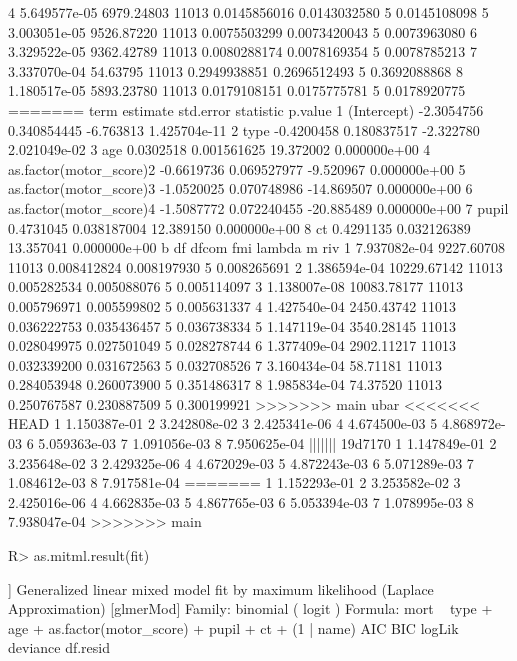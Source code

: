 \documentclass[
]{jss}
\begin{document}
\begin{CodeChunk}
\begin{CodeOutput}
4 5.649577e-05  6979.24803 11013 0.0145856016 0.0143032580 5 0.0145108098
5 3.003051e-05  9526.87220 11013 0.0075503299 0.0073420043 5 0.0073963080
6 3.329522e-05  9362.42789 11013 0.0080288174 0.0078169354 5 0.0078785213
7 3.337070e-04    54.63795 11013 0.2949938851 0.2696512493 5 0.3692088868
8 1.180517e-05  5893.23780 11013 0.0179108151 0.0175775781 5 0.0178920775
=======
                     term   estimate   std.error  statistic      p.value
1             (Intercept) -2.3054756 0.340854445  -6.763813 1.425704e-11
2                    type -0.4200458 0.180837517  -2.322780 2.021049e-02
3                     age  0.0302518 0.001561625  19.372002 0.000000e+00
4 as.factor(motor_score)2 -0.6619736 0.069527977  -9.520967 0.000000e+00
5 as.factor(motor_score)3 -1.0520025 0.070748986 -14.869507 0.000000e+00
6 as.factor(motor_score)4 -1.5087772 0.072240455 -20.885489 0.000000e+00
7                   pupil  0.4731045 0.038187004  12.389150 0.000000e+00
8                      ct  0.4291135 0.032126389  13.357041 0.000000e+00
             b          df dfcom         fmi      lambda m         riv
1 7.937082e-04  9227.60708 11013 0.008412824 0.008197930 5 0.008265691
2 1.386594e-04 10229.67142 11013 0.005282534 0.005088076 5 0.005114097
3 1.138007e-08 10083.78177 11013 0.005796971 0.005599802 5 0.005631337
4 1.427540e-04  2450.43742 11013 0.036222753 0.035436457 5 0.036738334
5 1.147119e-04  3540.28145 11013 0.028049975 0.027501049 5 0.028278744
6 1.377409e-04  2902.11217 11013 0.032339200 0.031672563 5 0.032708526
7 3.160434e-04    58.71181 11013 0.284053948 0.260073900 5 0.351486317
8 1.985834e-04    74.37520 11013 0.250767587 0.230887509 5 0.300199921
>>>>>>> main
          ubar
<<<<<<< HEAD
1 1.150387e-01
2 3.242808e-02
3 2.425341e-06
4 4.674500e-03
5 4.868972e-03
6 5.059363e-03
7 1.091056e-03
8 7.950625e-04
||||||| 19d7170
1 1.147849e-01
2 3.235648e-02
3 2.429325e-06
4 4.672029e-03
5 4.872243e-03
6 5.071289e-03
7 1.084612e-03
8 7.917581e-04
=======
1 1.152293e-01
2 3.253582e-02
3 2.425016e-06
4 4.662835e-03
5 4.867765e-03
6 5.053394e-03
7 1.078995e-03
8 7.938047e-04
>>>>>>> main
\end{CodeOutput}
\begin{CodeInput}
R> as.mitml.result(fit)
\end{CodeInput}
\begin{CodeOutput}
[[1]]
Generalized linear mixed model fit by maximum likelihood (Laplace
  Approximation) [glmerMod]
 Family: binomial  ( logit )
Formula: mort ~ type + age + as.factor(motor_score) + pupil + ct + (1 |  
    name)
      AIC       BIC    logLik  deviance  df.resid 

\end{CodeOutput}
\end{CodeChunk}
\end{document}

